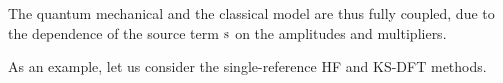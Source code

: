 The quantum mechanical and the classical model are thus fully coupled,
due to the dependence of the source term $\mathrm{s}$ on the amplitudes and
multipliers.

As an example, let us consider the single-reference \acrshort{HF} and
\acrshort{KS}-\acrshort{DFT} methods.

